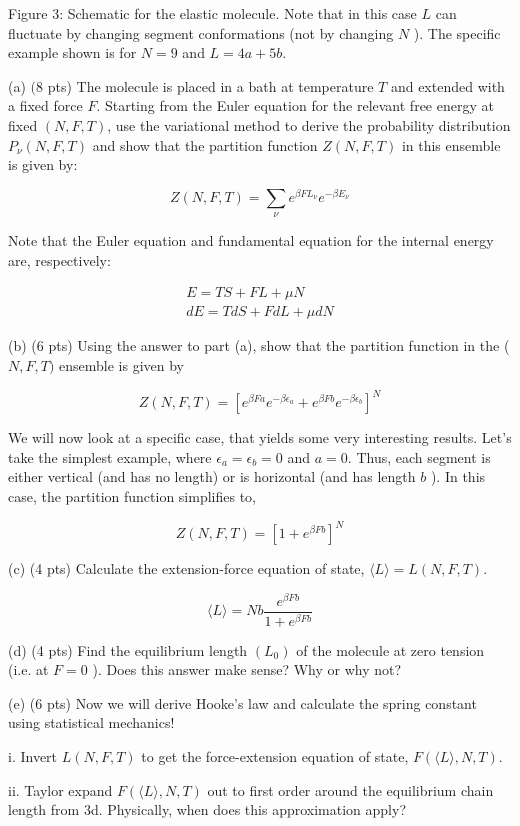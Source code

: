 \documentclass[10pt]{article}
\begin{document}
Figure 3: Schematic for the elastic molecule. Note that in this case $L$ can fluctuate by changing segment conformations (not by changing $N$ ). The specific example shown is for $N=9$ and $L=4 a+5 b$.

(a) $(8$ pts) The molecule is placed in a bath at temperature $T$ and extended with a fixed force $F$. Starting from the Euler equation for the relevant free energy at fixed $(N, F, T)$, use the variational method to derive the probability distribution $P_{\nu}(N, F, T)$ and show that the partition function $Z(N, F, T)$ in this ensemble is given by:

$$
Z(N, F, T)=\sum_{\nu} e^{\beta F L_{\nu}} e^{-\beta E_{\nu}}
$$

Note that the Euler equation and fundamental equation for the internal energy are, respectively:

$$
\begin{gathered}
E=T S+F L+\mu N \\
d E=T d S+F d L+\mu d N
\end{gathered}
$$

(b) (6 pts) Using the answer to part (a), show that the partition function in the ( $N, F, T)$ ensemble is given by

$$
Z(N, F, T)=\left[e^{\beta F a} e^{-\beta \epsilon_{a}}+e^{\beta F b} e^{-\beta \epsilon_{b}}\right]^{N}
$$

We will now look at a specific case, that yields some very interesting results. Let's take the simplest example, where $\epsilon_{a}=\epsilon_{b}=0$ and $a=0$. Thus, each segment is either vertical (and has no length) or is horizontal (and has length $b$ ). In this case, the partition function simplifies to,

$$
Z(N, F, T)=\left[1+e^{\beta F b}\right]^{N}
$$

(c) (4 pts) Calculate the extension-force equation of state, $\langle L\rangle=L(N, F, T)$.

$$
\langle L\rangle=N b \frac{e^{\beta F b}}{1+e^{\beta F b}}
$$

(d) (4 pts) Find the equilibrium length $\left(L_{0}\right)$ of the molecule at zero tension (i.e. at $F=0$ ). Does this answer make sense? Why or why not?

(e) (6 pts) Now we will derive Hooke's law and calculate the spring constant using statistical mechanics!

i. Invert $L(N, F, T)$ to get the force-extension equation of state, $F(\langle L\rangle, N, T)$.

ii. Taylor expand $F(\langle L\rangle, N, T)$ out to first order around the equilibrium chain length from 3d. Physically, when does this approximation apply?
\end{document}
